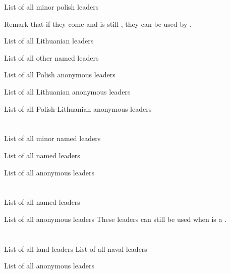 \aparag List of all minor polish leaders 

\bparag Remark that if they come and \paysPologne is still \MAJ, they can be
used by \POL.

\aparag List of all Lithuanian leaders 

\aparag List of all other named leaders 

\aparag List of all Polish anonymous leaders \listanonymepologne

\aparag List of all Lithuanian anonymous leaders \listanonymelithuanie

\aparag List of all Polish-Lithuanian anonymous leaders \listanonymepollit




\section{\paysmajeurPrusse}

\aparag List of all minor named leaders 

\aparag List of all named leaders 

\aparag List of all anonymous leaders \listanonymeprusseM




\section{\paysmajeurPortugal}

\aparag List of all named leaders 

\aparag List of all anonymous leaders
\bparag These leaders can still be used when \paysPortugal is a \MIN.
\listanonymeportugal




\section{\paysmajeurRussie}

\aparag List of all land leaders 
\aparag List of all naval leaders 

\aparag List of all anonymous leaders \listanonymerussie




\section{\paysmajeurSuede}

